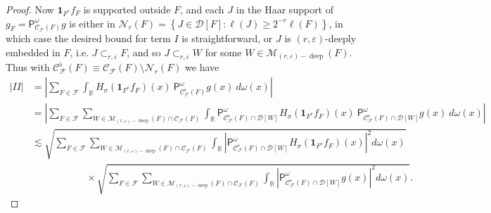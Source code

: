 \documentclass{amsart}%
\theoremstyle{plain}
\numberwithin{equation}{section}
\begin{document}
\begin{proof}
Now $\mathbf{1}_{F^{c}}f_{F}$ is supported outside $F$, and each $J$ in the
Haar support of $g_{F}=\mathsf{P}_{\mathcal{C}_{\mathcal{F}}\left(  F\right)
}^{\omega}g$ is either in $\mathcal{N}_{r}\left(  F\right)  =\left\{
J\in\mathcal{D}\left[  F\right]  :\ell\left(  J\right)  \geq2^{-r}\ell\left(
F\right)  \right\}  $, in which case the desired bound for term $I$ is
straightforward, or $J$ is $\left(  r,\varepsilon\right)  $-deeply embedded in
$F$, i.e. $J\subset_{r,\varepsilon}F$, and so $J\subset_{r,\varepsilon}W$ for
some $W\in\mathcal{M}_{\left(  r,\varepsilon\right)  -\operatorname*{deep}%
}\left(  F\right)  $. Thus with $\mathcal{C}_{\mathcal{F}}^{\flat}\left(
F\right)  \equiv\mathcal{C}_{\mathcal{F}}\left(  F\right)  \setminus
\mathcal{N}_{r}\left(  F\right)  $ we have%
\begin{align*}
\left\vert II\right\vert  & =\left\vert \sum_{F\in\mathcal{F}}\int
_{\mathbb{R}}H_{\sigma}\left(  \mathbf{1}_{F^{c}}f_{F}\right)  \left(
x\right)  \ \mathsf{P}_{\mathcal{C}_{\mathcal{F}}^{\flat}\left(  F\right)
}^{\omega}g\left(  x\right)  \ d\omega\left(  x\right)  \right\vert \\
& =\left\vert \sum_{F\in\mathcal{F}}\sum_{W\in\mathcal{M}_{\left(
r,\varepsilon\right)  -\operatorname*{deep}}\left(  F\right)  \cap
\mathcal{C}_{\mathcal{F}}\left(  F\right)  }\int_{\mathbb{R}}\mathsf{P}%
_{\mathcal{C}_{\mathcal{F}}^{\flat}\left(  F\right)  \cap\mathcal{D}\left[
W\right]  }^{\omega}H_{\sigma}\left(  \mathbf{1}_{F^{c}}f_{F}\right)  \left(
x\right)  \ \mathsf{P}_{\mathcal{C}_{\mathcal{F}}^{\flat}\left(  F\right)
\cap\mathcal{D}\left[  W\right]  }^{\omega}g\left(  x\right)  \ d\omega\left(
x\right)  \right\vert \\
& \lesssim\sqrt{\sum_{F\in\mathcal{F}}\sum_{W\in\mathcal{M}_{\left(
r,\varepsilon\right)  -\operatorname*{deep}}\left(  F\right)  \cap
\mathcal{C}_{\mathcal{F}}\left(  F\right)  }\int_{\mathbb{R}}\left\vert
\mathsf{P}_{\mathcal{C}_{\mathcal{F}}^{\flat}\left(  F\right)  \cap
\mathcal{D}\left[  W\right]  }^{\omega}H_{\sigma}\left(  \mathbf{1}_{F^{c}%
}f_{F}\right)  \left(  x\right)  \right\vert ^{2}d\omega\left(  x\right)  }\\
& \ \ \ \ \ \ \ \ \ \ \ \ \ \ \ \ \ \ \ \ \ \ \ \ \ \times\sqrt{\sum
_{F\in\mathcal{F}}\sum_{W\in\mathcal{M}_{\left(  r,\varepsilon\right)
-\operatorname*{deep}}\left(  F\right)  \cap\mathcal{C}_{\mathcal{F}}\left(
F\right)  }\int_{\mathbb{R}}\left\vert \mathsf{P}_{\mathcal{C}_{\mathcal{F}%
}^{\flat}\left(  F\right)  \cap\mathcal{D}\left[  W\right]  }^{\omega}g\left(
x\right)  \right\vert ^{2}d\omega\left(  x\right)  }.

\end{align*}
\end{proof}
\end{document}

